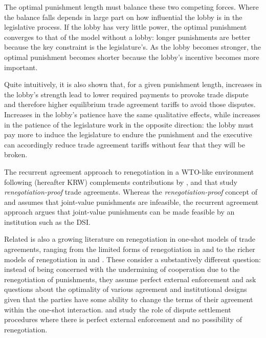 \documentclass[authoryear, review]{elsarticle}
\begin{document}
The optimal punishment length must balance these two competing forces. Where the balance falls depends in large part on how influential the lobby is in the legislative process. If the lobby has very little power, the optimal punishment converges to that of the model without a lobby: longer punishments are better because the key constraint is the legislature's. As the lobby becomes stronger, the optimal punishment becomes shorter because the lobby's incentive becomes more important.

Quite intuitively, it is also shown that, for a given punishment length, increases in the lobby's strength lead to lower required payments to provoke trade dispute and therefore higher equilibrium trade agreement tariffs to avoid those disputes. Increases in the lobby's patience have the same qualitative effects, while increases in the patience of the legislature work in the opposite direction: the lobby must pay more to induce the legislature to endure the punishment and the executive can accordingly reduce trade agreement tariffs without fear that they will be broken.

The recurrent agreement approach to renegotiation in a WTO-like environment following \citet{krw} (hereafter KRW) complements contributions by \citet{cotmitch}, \citet{ludema2001} and \citet{beshkar2010a} that study \textit{renegotiation-proof} trade agreements. Whereas the \textit{renegotiation-proof} concept of \citet{br89} and \citet{fm89} assumes that joint-value punishments are infeasible, the recurrent agreement approach argues that joint-value punishments can be made feasible by an institution such as the DSI.

Related is also a growing literature on renegotiation in one-shot models of trade agreements, ranging from the limited forms of renegotiation in \citet{bs1999} and \citet{beshkar2010b} to the richer models of renegotiation in \citet{beshkar2013} and \citet{ms2013,ms2012a}. These consider a substantively different question: instead of being concerned with the undermining of cooperation due to the renegotiation of punishments, they assume perfect external enforcement and ask questions about the optimality of various agreement and institutional designs given that the parties have some ability to change the terms of their agreement within the one-shot interaction. \citet{ethier} and \citet{ms2011} study the role of dispute settlement procedures where there is perfect external enforcement and no possibility of renegotiation.
\end{document}
